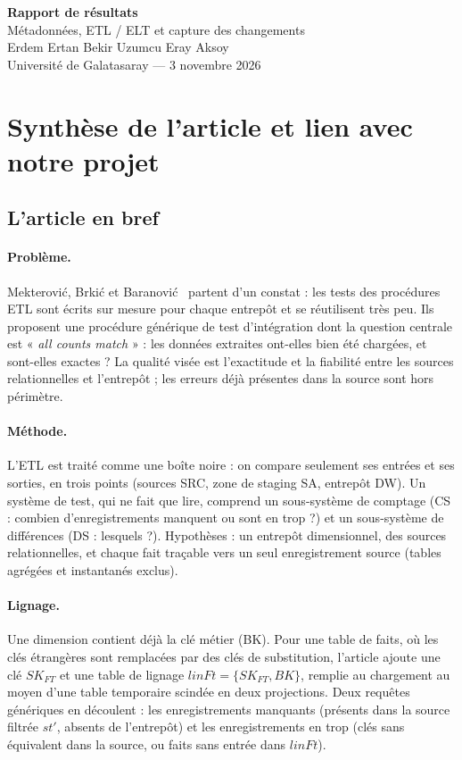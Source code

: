 \documentclass[10pt,a4paper]{article}
\begin{document}
\begin{center}
  {\LARGE\bfseries Rapport de résultats}\\[2pt]
  {\large Métadonnées, ETL / ELT et capture des changements}\\[4pt]
  Erdem Ertan \textperiodcentered{} Bekir Uzumcu \textperiodcentered{} Eray Aksoy\\
  Université de Galatasaray --- 3 novembre 2026
\end{center}

\section{Synthèse de l'article et lien avec notre projet}

\subsection{L'article en bref}

\paragraph{Problème.} Mekterovi\'c, Brki\'c et Baranovi\'c~\cite{mekterovic2011} partent d'un constat : les tests des procédures ETL sont écrits sur mesure pour chaque entrepôt et se réutilisent très peu. Ils proposent une procédure générique de test d'intégration dont la question centrale est « \emph{all counts match} » : les données extraites ont-elles bien été chargées, et sont-elles exactes ? La qualité visée est l'exactitude et la fiabilité entre les sources relationnelles et l'entrepôt ; les erreurs déjà présentes dans la source sont hors périmètre.

\paragraph{Méthode.} L'ETL est traité comme une boîte noire : on compare seulement ses entrées et ses sorties, en trois points (sources SRC, zone de staging SA, entrepôt DW). Un système de test, qui ne fait que lire, comprend un sous-système de comptage (CS : combien d'enregistrements manquent ou sont en trop ?) et un sous-système de différences (DS : lesquels ?). Hypothèses : un entrepôt dimensionnel, des sources relationnelles, et chaque fait traçable vers un seul enregistrement source (tables agrégées et instantanés exclus).

\paragraph{Lignage.} Une dimension contient déjà la clé métier (BK). Pour une table de faits, où les clés étrangères sont remplacées par des clés de substitution, l'article ajoute une clé $SK_{FT}$ et une table de lignage $linFt=\{SK_{FT},BK\}$, remplie au chargement au moyen d'une table temporaire scindée en deux projections. Deux requêtes génériques en découlent : les enregistrements manquants (présents dans la source filtrée $st'$, absents de l'entrepôt) et les enregistrements en trop (clés sans équivalent dans la source, ou faits sans entrée dans $linFt$).
\end{document}
